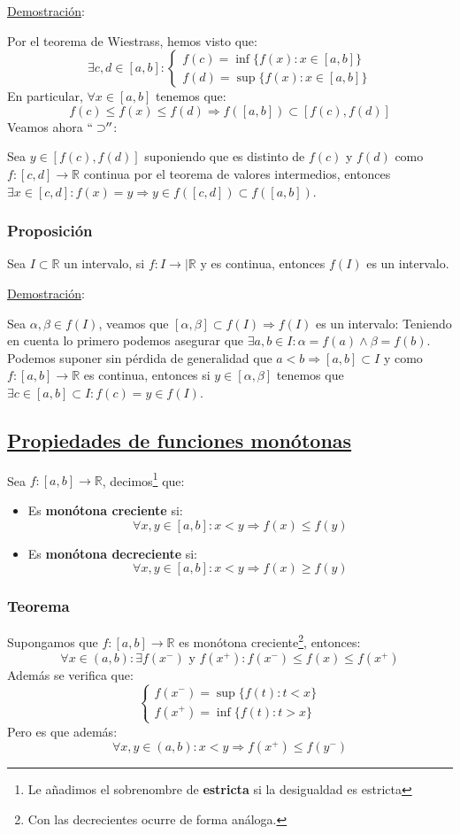 \documentclass[10pt,a4paper,openright]{book}
\begin{document}
\underline{Demostración}:\par
Por el teorema de Wiestrass, hemos visto que:
$$\exists c,d\in [a,b]:\begin{cases}f(c)=\inf\{f(x): x\in [a,b]\} \\ f(d)=\sup \{f(x):x\in [a,b]\} \end{cases}$$
En particular, $\forall x\in [a,b]$ tenemos que:
$$f(c)\leq f(x)\leq f(d)\Rightarrow f([a,b])\subset [f(c), f(d)]$$
Veamos ahora $``\supset''$:\par
Sea $y\in [f(c), f(d)]$ suponiendo que es distinto de $f(c)$ y $f(d)$ como $f:[c,d]\rightarrow \mathbb R$ continua por el teorema de valores intermedios, entonces $\exists x\in [c,d]: f(x)=y\Rightarrow y\in f([c,d])\subset f([a,b])$.

\subsubsection*{Proposición}
Sea $I\subset \mathbb R$ un intervalo, si $f: I\rightarrow |\mathbb R$ y es continua, entonces $f(I)$ es un intervalo.

\underline{Demostración}:\par
Sea $\alpha, \beta\in f(I)$, veamos que $[\alpha, \beta]\subset f(I)\Rightarrow f(I)$ es un intervalo:
Teniendo en cuenta lo primero podemos asegurar que $\exists a, b \in I: \alpha=f(a) \wedge \beta=f(b)$. Podemos suponer sin pérdida de generalidad que $a<b\Rightarrow [a,b]\subset I$ y como $f:[a,b]\rightarrow \mathbb R$ es continua, entonces si $y \in [\alpha,\beta]$ tenemos que $\exists c\in [a,b]\subset I: f(c)=y\in f(I)$.

\subsection*{\underline{Propiedades de funciones monótonas}}
Sea $f:[a,b]\rightarrow \mathbb R$, decimos\footnote{Le añadimos el sobrenombre de \textbf{estricta} si la desigualdad es estricta} que:
\begin{itemize}
\item Es \textbf{monótona creciente} si:
$$\forall x,y\in [a,b]: x<y\Rightarrow f(x)\leq f(y)$$

\item Es \textbf{monótona decreciente} si:
$$\forall x,y\in [a,b]: x<y\Rightarrow f(x)\geq f(y)$$

\end{itemize}
\subsubsection*{Teorema}
Supongamos que $f:[a,b]\rightarrow \mathbb R$ es monótona creciente\footnote{Con las decrecientes ocurre de forma análoga.}, entonces:
$$\forall x\in (a,b):\exists f(x^-)\mbox{ y }f(x^+): f(x^-)\leq f(x)\leq f(x^+)$$
Además se verifica que:
$$\begin{cases}f(x^-)=\sup\{f(t): t<x\} \\ f(x^+)=\inf\{f(t): t>x\}\end{cases}$$
Pero es que además:
$$\forall x,y\in (a,b): x<y\Rightarrow f(x^+)\leq f(y^-)$$
\end{document}
